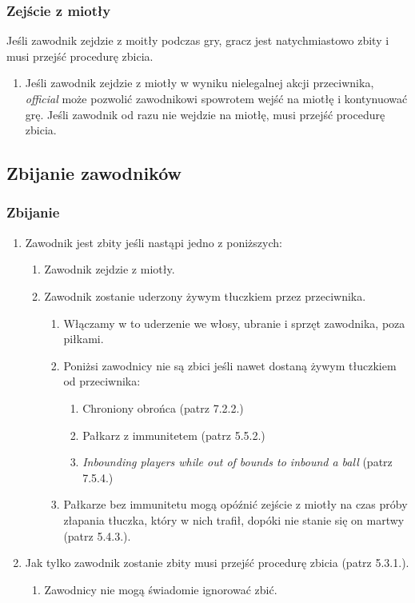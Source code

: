 \documentclass[11pt,a4paper]{article}
\begin{document}
\subsubsection{Zejście z miotły}
Jeśli zawodnik zejdzie z moitły podczas gry, gracz jest natychmiastowo zbity i musi przejść procedurę zbicia.
\begin{enumerate}
  \item Jeśli zawodnik zejdzie z miotły w wyniku nielegalnej akcji przeciwnika, \emph{official} może pozwolić zawodnikowi spowrotem wejść na miotłę i kontynuować grę. Jeśli zawodnik od razu nie wejdzie na miotłę, musi przejść procedurę zbicia.
\end{enumerate}

\subsection{Zbijanie zawodników}

\subsubsection{Zbijanie}
\begin{enumerate}
  \item Zawodnik jest zbity jeśli nastąpi jedno z poniższych:
  \begin{enumerate}
    \item Zawodnik zejdzie z miotły.
    \item Zawodnik zostanie uderzony żywym tłuczkiem przez przeciwnika.
    \begin{enumerate}
      \item Włączamy w to uderzenie we włosy, ubranie i sprzęt zawodnika, poza piłkami.
      \item Poniżsi zawodnicy nie są zbici jeśli nawet dostaną żywym tłuczkiem od przeciwnika:
      \begin{enumerate}
        \item Chroniony obrońca (patrz 7.2.2.) %
        \item Pałkarz z immunitetem (patrz 5.5.2.) %
        \item \emph{Inbounding players while out of bounds to inbound a ball} (patrz 7.5.4.) %
      \end{enumerate}
      \item Pałkarze bez immunitetu mogą opóźnić zejście z miotły na czas próby złapania tłuczka, który w nich trafił, dopóki nie stanie się on martwy (patrz 5.4.3.). %
    \end{enumerate}
  \end{enumerate}
  \item Jak tylko zawodnik zostanie zbity musi przejść procedurę zbicia (patrz 5.3.1.). %
  \begin{enumerate}
    \item Zawodnicy nie mogą świadomie ignorować zbić.
  \end{enumerate}
\end{enumerate}
\end{document}
